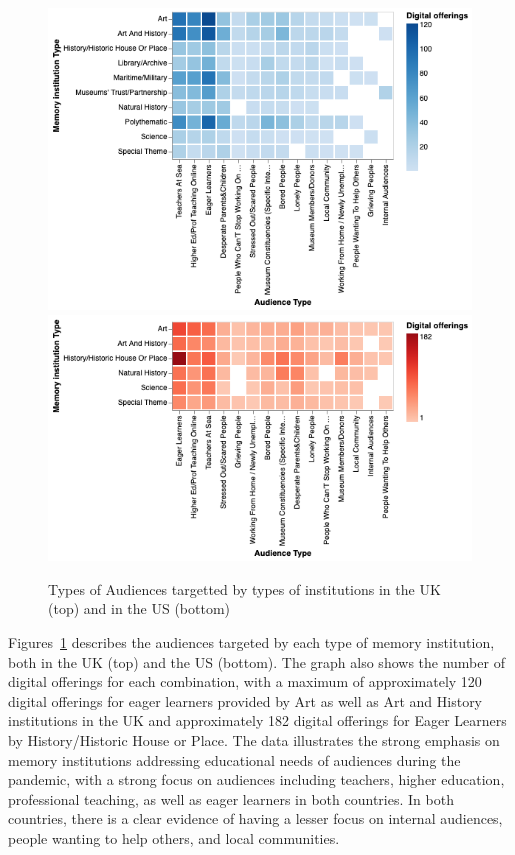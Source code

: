 \documentclass{egpubl}
\begin{document}
\begin{figure}[h]
  \centering
  \includegraphics[width=\linewidth]{images/audiencesUK.png}
  \includegraphics[width=\linewidth]{images/audiencesUS.png}
  \caption{\label{fig:MTypeAudiences}
           Types of Audiences targetted by types of institutions in the UK (top) and in the US (bottom)}
\end{figure}
Figures~\ref{fig:MTypeAudiences} describes the audiences targeted by each type of memory institution, both in the UK (top) and the US (bottom). The graph also shows the number of digital offerings for each combination, with a maximum of approximately 120 digital offerings for eager learners provided by Art as well as Art and History institutions in the UK and approximately 182 digital offerings for Eager Learners by History/Historic House or Place. The data illustrates the strong emphasis on memory institutions addressing educational needs of audiences during the pandemic, with a strong focus on audiences including teachers, higher education, professional teaching, as well as eager learners in both countries. In both countries, there is a clear evidence of having a lesser focus on internal audiences, people wanting to help others, and local communities. 
\end{document}
